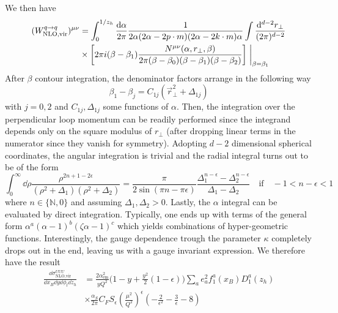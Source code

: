 We then have
\begin{equation}
\begin{aligned}
       (W^{q \to q}_{\text{NLO,vir}})^{\mu\nu} &=\int_0^{1/z_h}\frac{\dd \alpha}{2\pi} \frac{1}{2\alpha(2\alpha-2p \cdot m)(2\alpha-2 k \cdot m)\alpha}\int \frac{\dd^{d-2}r_\perp}{(2\pi)^{d-2}}\\
       &\times \left[2\pi i(\beta-\beta_1)\frac{N^{\mu\nu}(\alpha,r_\perp,\beta)}{2\pi(\beta-\beta_0)(\beta-\beta_1)(\beta-\beta_2)}\right]\eval_{\beta=\beta_1} 
\end{aligned}
\end{equation}
After $\beta$ contour integration, the denominator factors arrange in the following way
\begin{equation}\label{eq:betaimbetaj=C(rt2+Del)}
    \beta_1-\beta_j=C_{1j}(\vec r_\perp^2+\Delta_{1j})
\end{equation}
with $j=0,2$ and $C_{1j},\Delta_{1j}$ some functions of $\alpha$. Then, the integration over the perpendicular loop momentum can be readily performed since the integrand depends only on the square modulus of $r_\perp$ (after dropping linear terms in the numerator since they vanish for symmetry). Adopting $d-2$ dimensional spherical coordinates, the angular integration is trivial and the radial integral turns out to be of the form
\begin{equation}
    \int_0^\infty \dd \rho \frac{ \rho^{2n+1-2\epsilon}}{(\rho^2+\Delta_1)(\rho^2+\Delta_2)}=\frac{\pi}{2\sin(\pi n-\pi\epsilon)}\frac{\Delta_1^{n-\epsilon}-\Delta_2^{n-\epsilon}}{\Delta_1-\Delta_2}\quad \text{if} \quad -1<n-\epsilon<1
\end{equation}
where $n\in \{\mathbb{N},0\}$ and assuming $\Delta_1,\Delta_2>0$. Lastly, the $\alpha$ integral can be evaluated by direct integration. Typically, one ends up with terms of the general form $\alpha^a (\alpha-1)^b (\zeta \alpha-1)^c$ which yields combinations of hyper-geometric functions. Interestingly, the gauge dependence trough the parameter $\kappa$ completely drops out in the end, leaving us with a gauge invariant expression. We therefore have the result
\begin{equation}\label{eq:NLO unpolarized virtual}\boxed{
\begin{aligned}
      \frac{\dd \sigma^{UUU}_{\text{NLO,vir}}}{\dd x_B \dd y \dd \phi_l \dd z_h}&=\frac{2\alpha_{\text{em}}^2}{yQ^2}\Big(1-y+\frac{y^2}{2}(1-\epsilon) \Big)\sum_a e_a^2f_1^a(x_B)D_1^a(z_h)\\
      &\times\frac{\alpha_S}{2\pi}  C_F S_\epsilon \left(\frac{\mu^2}{Q^2}\right)^{\epsilon}\left(-\frac{2}{\epsilon^2}-\frac{3}{\epsilon}-8\right)
\end{aligned}}
\end{equation}
